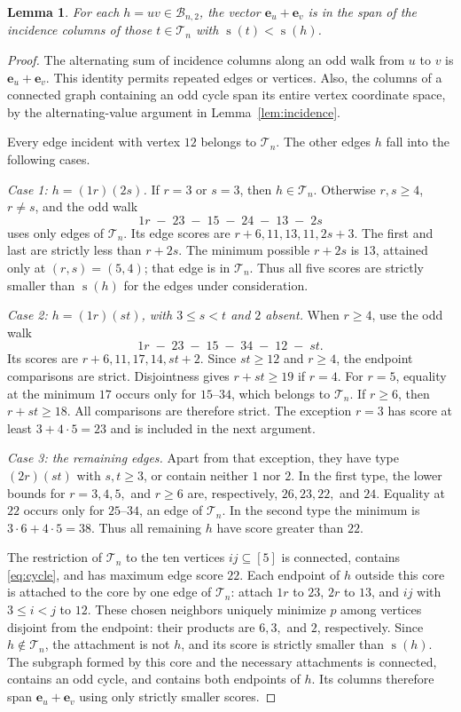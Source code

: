 \documentclass[11pt,a4paper]{article}
\newtheorem{lemma}[theorem]{Lemma}
\newcommand{\TT}{\mathcal{T}_n}
\newcommand{\BB}{\mathcal{B}_{n,2}}
\DeclareMathOperator{\score}{s}
\begin{document}
\begin{lemma}\label{lem:score}
For each $h=uv\in\BB$, the vector $\mathbf e_u+\mathbf e_v$ is in the
span of the incidence columns of those $t\in\TT$ with
$\score(t)<\score(h)$.
\end{lemma}

\begin{proof}
The alternating sum of incidence columns along an odd walk from $u$ to
$v$ is $\mathbf e_u+\mathbf e_v$. This identity permits repeated edges
or vertices. Also, the columns of a connected graph containing an odd
cycle span its entire vertex coordinate space, by the alternating-value
argument in Lemma~\ref{lem:incidence}.

Every edge incident with vertex $12$ belongs to $\TT$. The other edges
$h$ fall into the following cases.

\smallskip\noindent
\emph{Case 1: $h=(1r)(2s)$.}
If $r=3$ or $s=3$, then $h\in\TT$. Otherwise $r,s\geq4$, $r\ne s$,
and the odd walk
\[
 1r\;-\;23\;-\;15\;-\;24\;-\;13\;-\;2s
\]
uses only edges of $\TT$. Its edge scores are
$r+6,11,13,11,2s+3$. The first and last are strictly less than $r+2s$.
The minimum possible $r+2s$ is $13$, attained only at $(r,s)=(5,4)$;
that edge is in $\TT$. Thus all five scores are strictly smaller than
$\score(h)$ for the edges under consideration.

\smallskip\noindent
\emph{Case 2: $h=(1r)(st)$, with $3\leq s<t$ and $2$ absent.}
When $r\geq4$, use the odd walk
\[
 1r\;-\;23\;-\;15\;-\;34\;-\;12\;-\;st.
\]
Its scores are $r+6,11,17,14,st+2$. Since $st\geq12$ and $r\geq4$,
the endpoint comparisons are strict. Disjointness gives $r+st\geq19$
if $r=4$. For $r=5$, equality at the minimum $17$ occurs only for
$15$--$34$, which belongs to $\TT$. If $r\geq6$, then $r+st\geq18$.
All comparisons are therefore strict. The exception $r=3$ has score
at least $3+4\cdot5=23$ and is included in the next argument.

\smallskip\noindent
\emph{Case 3: the remaining edges.}
Apart from that exception, they have type $(2r)(st)$ with $s,t\geq3$,
or contain neither $1$ nor $2$. In the first type, the lower bounds
for $r=3,4,5,$ and $r\geq6$ are, respectively, $26,23,22,$ and $24$.
Equality at $22$ occurs only for $25$--$34$, an edge of $\TT$.
In the second type the minimum is $3\cdot6+4\cdot5=38$.
Thus all remaining $h$ have score greater than $22$.

The restriction of $\TT$ to the ten vertices $ij\subseteq[5]$ is
connected, contains \eqref{eq:cycle}, and has maximum edge score $22$.
Each endpoint of $h$ outside this core is attached to the core by one
edge of $\TT$: attach $1r$ to $23$, $2r$ to $13$, and $ij$ with
$3\leq i<j$ to $12$. These chosen neighbors uniquely minimize $p$
among vertices disjoint from the endpoint: their products are $6,3,$
and $2$, respectively. Since $h\notin\TT$, the attachment is not $h$,
and its score is strictly smaller than $\score(h)$. The subgraph formed
by this core and the necessary attachments is connected, contains an odd
cycle, and contains both endpoints of $h$. Its columns therefore span
$\mathbf e_u+\mathbf e_v$ using only strictly smaller scores.
\end{proof}
\end{document}
